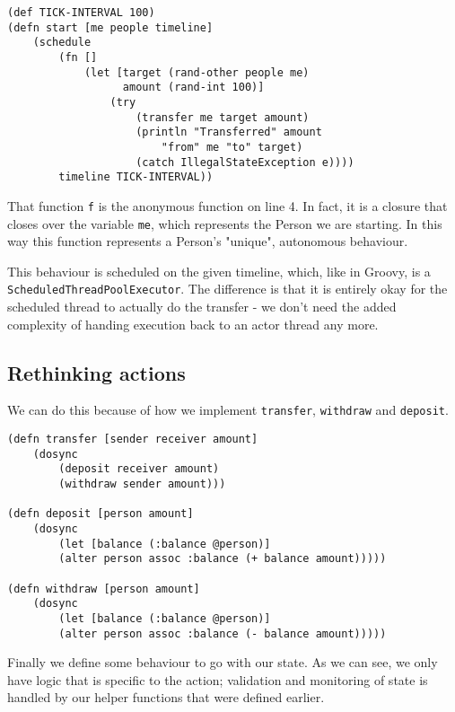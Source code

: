 \documentclass[a4paper,12pt]{kth-mag}
\begin{document}
\begin{listing}[H]
	\begin{verbatim}
(def TICK-INTERVAL 100) 
(defn start [me people timeline]
    (schedule
        (fn [] 
            (let [target (rand-other people me)
                  amount (rand-int 100)]
                (try 
                    (transfer me target amount)
                    (println "Transferred" amount 
                        "from" me "to" target)
                    (catch IllegalStateException e))))
        timeline TICK-INTERVAL))
	\end{verbatim}
\end{listing}

That function \texttt{f} is the anonymous function on line 4. In fact, it is a closure that closes over the variable \texttt{me}, which represents the Person we are starting. In this way this function represents a Person's "unique", autonomous behaviour. 

This behaviour is scheduled on the given timeline, which, like in Groovy, is a \texttt{ScheduledThreadPoolExecutor}. The difference is that it is entirely okay for the scheduled thread to actually do the transfer - we don't need the added complexity of handing execution back to an actor thread any more.

\subsection{Rethinking actions}

We can do this because of how we implement \texttt{transfer}, \texttt{withdraw} and \texttt{deposit}.

\begin{listing}[H]
	\begin{verbatim}
(defn transfer [sender receiver amount]
    (dosync
        (deposit receiver amount)
        (withdraw sender amount)))

(defn deposit [person amount]
    (dosync
        (let [balance (:balance @person)]
        (alter person assoc :balance (+ balance amount)))))

(defn withdraw [person amount]
    (dosync
        (let [balance (:balance @person)]
        (alter person assoc :balance (- balance amount)))))
	\end{verbatim}
\end{listing}

Finally we define some behaviour to go with our state. As we can see, we only have logic that is specific to the action; validation and monitoring of state is handled by our helper functions that were defined earlier.
\end{document}
